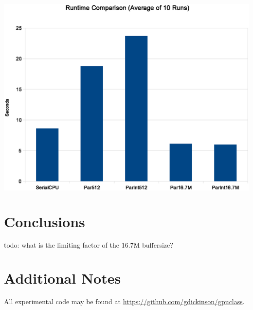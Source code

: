 \documentclass[twocolumn]{article}
\begin{document}
  \includegraphics[scale=0.75]{gpuruntimes.eps} 

  \section{Conclusions}
   todo: what is the limiting factor of the 16.7M buffersize?

  \section{Additional Notes}
  All experimental code may be found at \url{https://github.com/gdickinson/gpuclass}.
  
  {}
  
  
\end{document}
